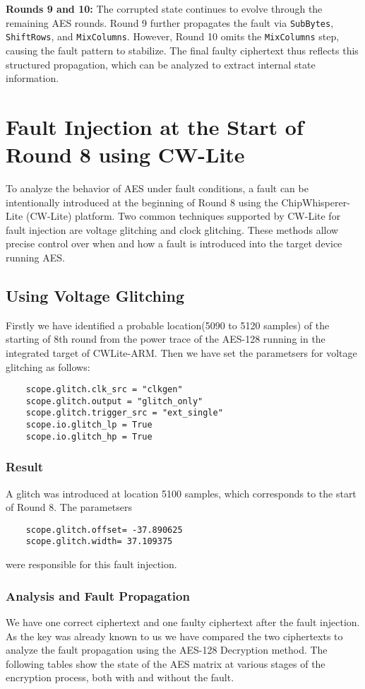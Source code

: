 \textbf{Rounds 9 and 10:}
The corrupted state continues to evolve through the remaining AES rounds. Round 9 further propagates the fault via \texttt{SubBytes}, \texttt{ShiftRows}, and \texttt{MixColumns}. However, Round 10 omits the \texttt{MixColumns} step, causing the fault pattern to stabilize. The final faulty ciphertext thus reflects this structured propagation, which can be analyzed to extract internal state information.

\section{Fault Injection at the Start of Round 8 using CW-Lite}

To analyze the behavior of AES under fault conditions, a fault can be intentionally introduced at the beginning of Round 8 using the ChipWhisperer-Lite (CW-Lite) platform. Two common techniques supported by CW-Lite for fault injection are voltage glitching and clock glitching. These methods allow precise control over when and how a fault is introduced into the target device running AES.

\subsection{Using Voltage Glitching}
Firstly we have identified a probable location(5090 to 5120 samples) of the starting of 8th round from the power trace of the AES-128 running in the integrated target of CWLite-ARM. Then we have set the parametsers for voltage glitching as follows:
\begin{verbatim}
    scope.glitch.clk_src = "clkgen"
    scope.glitch.output = "glitch_only" 
    scope.glitch.trigger_src = "ext_single"
    scope.io.glitch_lp = True
    scope.io.glitch_hp = True
\end{verbatim}
\subsubsection{Result}
A glitch was introduced at location 5100 samples, which corresponds to the start of Round 8. The parametsers 
\begin{verbatim}
    scope.glitch.offset= -37.890625 
    scope.glitch.width= 37.109375
\end{verbatim}
were responsible for this fault injection.

\subsubsection{Analysis and Fault Propagation}
We have one correct ciphertext and one faulty ciphertext after the fault injection. As the key was already known to us we have compared the two ciphertexts to analyze the fault propagation using the AES-128 Decryption method. The following tables show the state of the AES matrix at various stages of the encryption process, both with and without the fault.


